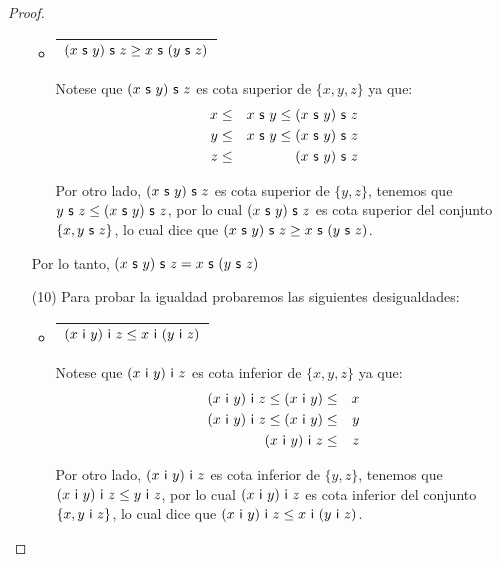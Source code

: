 \begin{proof}
\begin{enumerate}
\begin{itemize}
          \item \begin{tabular}{|c|} \hline $(x \ \SU \ y) \ \SU \ z \geq x \ \SU \ (y \ \SU \ z)$\\\hline \end{tabular}
            \PN Notese que $(x \ \SU \ y) \ \SU \ z$ es cota superior de $\{x, y, z\}$ ya que:
            \begin{eqnarray*}
              x &\leq& x \ \mathsf{s} \ y \leq (x \ \mathsf{s} \ y) \ \mathsf{s} \ z \\
              y &\leq& x \ \mathsf{s} \ y \leq (x \ \mathsf{s} \ y) \ \mathsf{s} \ z \\
              z &\leq& (x \ \mathsf{s} \ y) \ \mathsf{s} \ z
            \end{eqnarray*}

            \PN Por otro lado, $(x \ \SU \ y) \ \SU \ z$ es cota superior de $\{y, z\}$, tenemos que $y \ \mathsf{s} \ z \leq
            (x \ \mathsf{s} \ y) \ \mathsf{s} \ z$, por lo cual $(x \ \SU \ y) \ \SU \ z$ es cota superior del conjunto $\{x, y \ \mathsf{s}
            \ z\}$, lo cual dice que $(x \ \SU \ y) \ \SU \ z \geq x \ \SU \ (y \ \SU \ z)$.
        \end{itemize}

        \PN Por lo tanto, $(x \ \mathsf{s} \ y) \ \mathsf{s} \ z = x \ \mathsf{s} \ (y \ \mathsf{s} \ z)$

      \item[(10)] Para probar la igualdad probaremos las siguientes desigualdades:
        \begin{itemize}
          \item \begin{tabular}{|c|} \hline $(x \ \IN \ y) \ \IN \ z \leq x \ \IN \ (y \ \IN \ z)$\\\hline \end{tabular}
            \PN Notese que $(x \ \IN \ y) \ \IN \ z$ es cota inferior de $\{x, y, z\}$ ya que:
            \begin{eqnarray*}
              (x \ \mathsf{i} \ y) \ \mathsf{i} \ z \leq (x \ \mathsf{i} \ y) &\leq& x \\
              (x \ \mathsf{i} \ y) \ \mathsf{i} \ z \leq (x \ \mathsf{i} \ y) &\leq& y \\
              (x \ \mathsf{i} \ y) \ \mathsf{i} \ z &\leq& z
            \end{eqnarray*}

            \PN Por otro lado, $(x \ \IN \ y) \ \IN \ z$ es cota inferior de $\{y, z\}$, tenemos que $(x \ \mathsf{i} \ y) \
            \mathsf{i} \ z \leq y \ \mathsf{i} \ z$, por lo cual $(x \ \IN \ y) \ \IN \ z$ es cota inferior del conjunto $\{x, y \ \mathsf{i}
            \ z\}$, lo cual dice que $(x \ \IN \ y) \ \IN \ z \leq x \ \IN \ (y \ \IN \ z)$.


\end{itemize}
\end{enumerate}
\end{proof}
